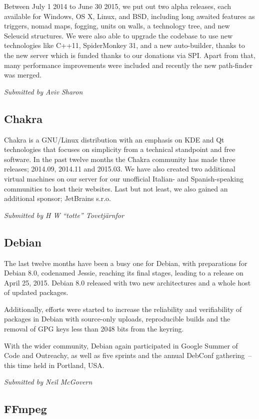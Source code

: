 \documentclass[letterpaper]{report}
\begin{document}
Between July 1 2014 to June 30 2015, we put out two alpha releases, each
available for Windows, OS X, Linux, and BSD, including long awaited
features as triggers, nomad maps, fogging, units on walls, a technology
tree, and new Seleucid structures. We were also able to upgrade the
codebase to use new technologies like C++11, SpiderMonkey 31, and a new
auto-builder, thanks to the new server which is funded thanks to our
donations via SPI. Apart from that, many performance improvements were
included and recently the new path-finder was merged.

{\em Submitted by Aviv Sharon}

\subsection{Chakra}

Chakra is a GNU/Linux distribution with an emphasis on KDE and Qt
technologies that focuses on simplicity from a technical standpoint and
free software.  In the past twelve months the Chakra community has made
three releases; 2014.09, 2014.11 and 2015.03.  We have also created two
additional virtual machines on our server for our unofficial Italian- and
Spanish-speaking communities to host their websites.  Last but not least,
we also gained an additional sponsor; JetBrains s.r.o.

{\em Submitted by H W ``totte'' Tovetjärnfor}

\subsection{Debian}

The last twelve months have been a busy one for Debian, with
preparations for Debian 8.0, codenamed Jessie, reaching its final stages,
leading to a release on April 25, 2015. Debian 8.0 released with two
new architectures and a whole host of updated packages.

Additionally, efforts were started to increase the reliability and
verifiability of packages in Debian with source-only uploads, reproducible
builds and the removal of GPG keys less than 2048 bits from the keyring.

With the wider community, Debian again participated in Google Summer of
Code and Outreachy, as well as five sprints and the annual DebConf
gathering~--this time held in Portland, USA.

{\em Submitted by Neil McGovern}

\subsection{FFmpeg}
\end{document}
